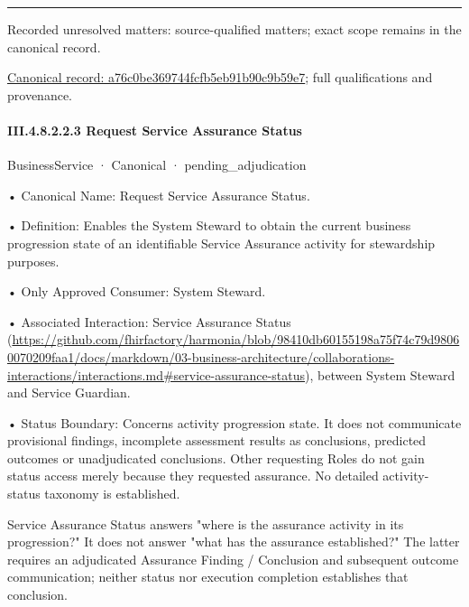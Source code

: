 \medskip\hrule\medskip

{\small Recorded unresolved matters: source-qualified matters; exact scope remains in the canonical record.}\par
{\footnotesize \href{../../../../../../../continuum/business/business-service/a76c0be369744fcfb5eb91b90c9b59e7.md}{Canonical record: a76c0be369744fcfb5eb91b90c9b59e7}; full qualifications and provenance.}\par
\paragraph*{III.4.8.2.2.3 Request Service Assurance Status}
\label{navigation:III.4.8.2.2.3}

\label{element:60f8cbc814614f669f31d4e78734c6d6}
{\small BusinessService · Canonical · pending\_adjudication}\par

•
Canonical Name: Request Service Assurance Status.



•
Definition: Enables the System Steward to obtain the current business progression state of an identifiable Service Assurance activity for stewardship purposes.



•
Only Approved Consumer: System Steward.



•
Associated Interaction: Service Assurance Status (\url{https://github.com/fhirfactory/harmonia/blob/98410db60155198a75f74c79d98060070209faa1/docs/markdown/03-business-architecture/collaborations-interactions/interactions.md#service-assurance-status}), between System Steward and Service Guardian.



•
Status Boundary: Concerns activity progression state. It does not communicate provisional findings, incomplete assessment results as conclusions, predicted outcomes or unadjudicated conclusions. Other requesting Roles do not gain status access merely because they requested assurance. No detailed activity-status taxonomy is established.



Service Assurance Status answers "where is the assurance activity in its progression?" It does not answer "what has the assurance established?" The latter requires an adjudicated Assurance Finding / Conclusion and subsequent outcome communication; neither status nor execution completion establishes that conclusion.



